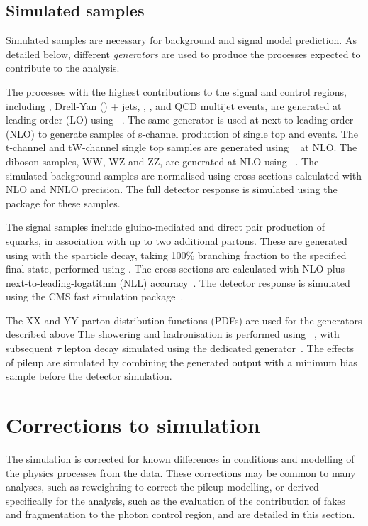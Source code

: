 \subsection{Simulated samples}
Simulated samples are necessary for background and signal model prediction. As detailed below, 
different \emph{generators} are used to produce the processes expected to contribute to
the \alphat analysis.

The processes with the highest contributions to the signal and control regions, 
including \zj, Drell-Yan (\dy) + jets, \gj, \ttbar, \wj and QCD multijet events, are generated at leading order (LO) 
using \MADGRAPH \AMCATNLO~\cite{Alwall:2014hca}. The same generator is used at next-to-leading order (NLO)
to generate samples of s-channel production of single top and \ttV events.
The t-channel and tW-channel single top samples are generated using \POWHEG~\cite{Alioli:2010xd} at NLO.
The diboson samples, WW, WZ and ZZ, are generated at NLO using \PYTHIA~\cite{PYTHIA}. 
The simulated background samples are normalised using cross sections calculated with NLO and NNLO precision.%
The full detector response is simulated using the \GEANTfour package for these samples.

The signal samples include gluino-mediated and direct pair production of squarks, in
association with up to two additional partons. These are generated using \MADGRAPH \AMCATNLO
with the sparticle decay, taking 100\% branching fraction to the specified final state, 
performed using \PYTHIA. The cross sections are calculated with
NLO plus next-to-leading-logatithm (NLL) accuracy~\cite{sparticleXs}. The detector response
is simulated using the CMS fast simulation package~\cite{fastsim}.

The XX and YY parton distribution functions (PDFs) are used for the generators described above
The showering and hadronisation is performed using \PYTHIA~\cite{PYTHIA}, with subsequent 
$\tau$ lepton decay simulated using the dedicated \TAUOLA generator~\cite{TAUOLO}. The effects
of pileup are simulated by combining the generated output with a minimum bias sample 
before the detector simulation.

\section{Corrections to simulation}
The simulation is corrected for known differences in conditions and modelling of
the physics processes from the data. These corrections may be common to many analyses,
such as reweighting to correct the pileup modelling, or derived specifically for the \alphat 
analysis, such as the evaluation of the contribution of fakes and fragmentation
to the photon control region, and are detailed in this section.
